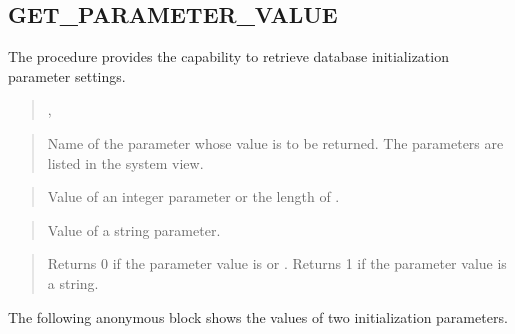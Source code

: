 \documentclass[letterpaper,10pt,english,openany,oneside]{sphinxmanual}
\begin{document}
\newpage


\subsection{GET\_PARAMETER\_VALUE}
\label{\detokenize{dbms_utility:get-parameter-value}}
The  procedure provides the capability to retrieve
database initialization parameter settings.
\begin{quote}

,
\begin{quote}

\end{quote}
\end{quote}


\begin{quote}

Name of the parameter whose value is to be returned. The parameters are
listed in the  system view.
\end{quote}

\begin{quote}

Value of an integer parameter or the length of .
\end{quote}

\begin{quote}

Value of a string parameter.
\end{quote}

\begin{quote}

Returns 0 if the parameter value is  or . Returns 1 if the
parameter value is a string.
\end{quote}


The following anonymous block shows the values of two initialization
parameters.
\end{document}
